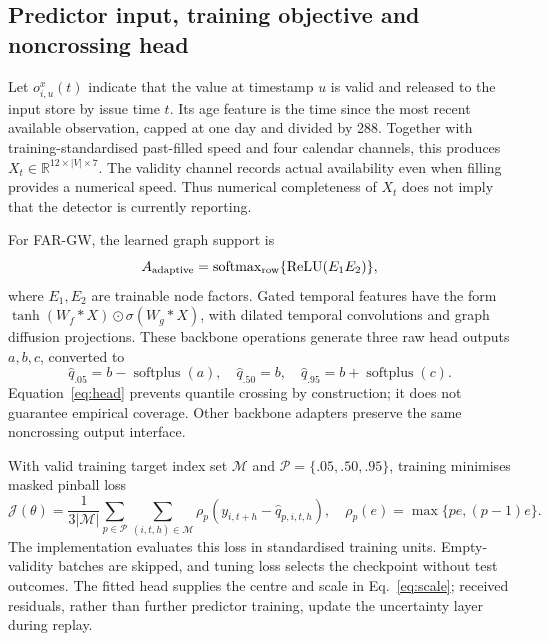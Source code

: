 \documentclass[pdflatex,sn-mathphys-num]{sn-jnl}
\begin{document}
\subsection{Predictor input, training objective and noncrossing head}
Let $o^x_{i,u}(t)$ indicate that the value at timestamp $u$ is valid and released to the input store by issue time $t$. Its age feature is the time since the most recent available observation, capped at one day and divided by 288. Together with training-standardised past-filled speed and four calendar channels, this produces $X_t\in\mathbb R^{12\times |V|\times7}$. The validity channel records actual availability even when filling provides a numerical speed. Thus numerical completeness of $X_t$ does not imply that the detector is currently reporting.

For FAR-GW, the learned graph support is
\begin{equation}
A_{\rm adaptive}=\operatorname{softmax}_{\rm row}\{\operatorname{ReLU}(E_1E_2)\},
\end{equation}
where $E_1,E_2$ are trainable node factors. Gated temporal features have the form $\tanh(W_f*X)\odot\sigma(W_g*X)$, with dilated temporal convolutions and graph diffusion projections. These backbone operations generate three raw head outputs $a,b,c$, converted to
\begin{equation}
\widehat q_{.05}=b-\operatorname{softplus}(a),\quad
\widehat q_{.50}=b,\quad
\widehat q_{.95}=b+\operatorname{softplus}(c).
\label{eq:head}
\end{equation}
Equation~\eqref{eq:head} prevents quantile crossing by construction; it does not guarantee empirical coverage. Other backbone adapters preserve the same noncrossing output interface.

With valid training target index set $\mathcal M$ and $\mathcal P=\{.05,.50,.95\}$, training minimises masked pinball loss \citep{koenker1978}
\begin{equation}
\mathcal J(\theta)=\frac{1}{3|\mathcal M|}\sum_{p\in\mathcal P}\sum_{(i,t,h)\in\mathcal M}
\rho_p(y_{i,t+h}-\widehat q_{p,i,t,h}),\quad
\rho_p(e)=\max\{pe,(p-1)e\}.
\end{equation}
The implementation evaluates this loss in standardised training units. Empty-validity batches are skipped, and tuning loss selects the checkpoint without test outcomes. The fitted head supplies the centre and scale in Eq.~\eqref{eq:scale}; received residuals, rather than further predictor training, update the uncertainty layer during replay.
\end{document}
